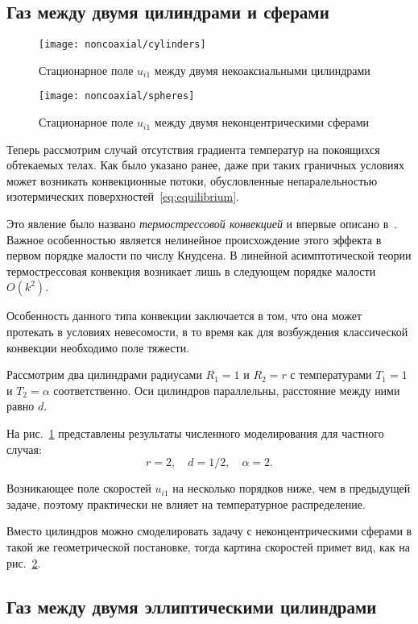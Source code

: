 \documentclass[english,russian,a4paper,10pt]{article}
\begin{document}
\subsection{Газ между двумя цилиндрами и сферами}

\begin{figure}[ht]
	\centering
	\texttt{[image: noncoaxial/cylinders]}
	\caption{Стационарное поле \(u_{i1}\) между двумя некоаксиальными цилиндрами}\label{fig:cylinders}
\end{figure}

\begin{figure}
	\centering
	\texttt{[image: noncoaxial/spheres]}
	\caption{Стационарное поле \(u_{i1}\) между двумя неконцентрическими сферами}\label{fig:spheres}
\end{figure}

Теперь рассмотрим случай отсутствия градиента температур на покоящихся обтекаемых телах.
Как было указано ранее, даже при таких граничных условиях может возникать конвекционные потоки,
обусловленные непаралельностью изотермических поверхностей~\eqref{eq:equilibrium}.

Это явление было названо \textit{термострессовой конвекцией} и впервые описано в~\cite{Kogan1971}.
Важное особенностью является нелинейное происхождение этого эффекта в первом порядке малости по числу Кнудсена.
В линейной асимптотической теории термострессовая конвекция возникает лишь в следующем порядке малости \(O(k^2)\).

Особенность данного типа конвекции заключается в том, что она может протекать в условиях невесомости,
в то время как для возбуждения классической конвекции необходимо поле тяжести.

Рассмотрим два цилиндрами радиусами \(R_1=1\) и \(R_2=r\)
с температурами \(T_1=1\) и \(T_2=\alpha\) соответственно.
Оси цилиндров параллельны, расстояние между ними равно \(d\).

На рис.~\ref{fig:cylinders} представлены результаты численного моделирования для частного случая:
\[ r = 2, \quad d = 1/2, \quad \alpha = 2.\]

Возникающее поле скоростей \(u_{i1}\) на несколько порядков ниже, чем в предыдущей задаче, поэтому практически не влияет на температурное распределение.

Вместо цилиндров можно смоделировать задачу с неконцентрическими сферами в такой же геометрической постановке,
тогда картина скоростей примет вид, как на рис.~\ref{fig:spheres}.

\subsection{Газ между двумя эллиптическими цилиндрами}
\end{document}
